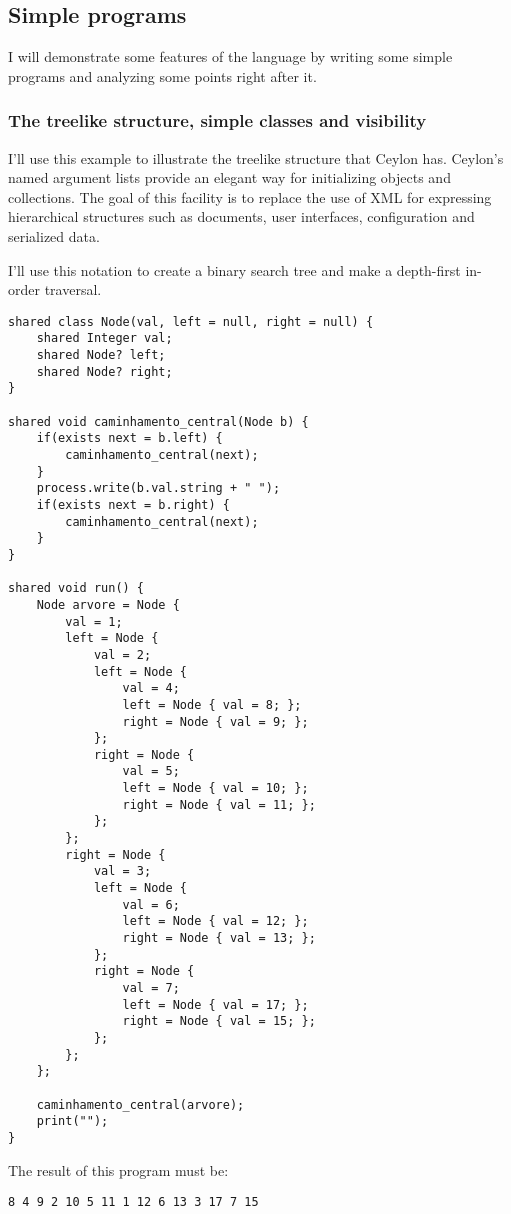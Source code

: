 \documentclass{abnt}
\begin{document}
\subsection{Simple programs}

I will demonstrate some features of the language by writing some simple programs
and analyzing some points right after it.

\subsubsection{The treelike structure, simple classes and visibility}

I'll use this example to illustrate the treelike structure that Ceylon has.
Ceylon's named argument lists provide an elegant way for initializing objects
and collections. The goal of this facility is to replace the use of XML for
expressing hierarchical structures such as documents, user interfaces,
configuration and serialized data.

I'll use this notation to create a binary search tree and make a depth-first
in-order traversal.

\begin{lstlisting}[label=ctls,caption=Ceylon treelike structure]
shared class Node(val, left = null, right = null) {
	shared Integer val;
	shared Node? left;
	shared Node? right;
}

shared void caminhamento_central(Node b) {
	if(exists next = b.left) {
		caminhamento_central(next);
	}
	process.write(b.val.string + " ");
	if(exists next = b.right) {
		caminhamento_central(next);
	}
}

shared void run() {
	Node arvore = Node {
		val = 1;
		left = Node {
			val = 2;
			left = Node {
				val = 4;
				left = Node { val = 8; };
				right = Node { val = 9; };
			};
			right = Node {
				val = 5;
				left = Node { val = 10; };
				right = Node { val = 11; };
			};
		};
		right = Node {
			val = 3;
			left = Node {
				val = 6;
				left = Node { val = 12; };
				right = Node { val = 13; };
			};
			right = Node {
				val = 7;
				left = Node { val = 17; };
				right = Node { val = 15; };
			};
		};
	};

	caminhamento_central(arvore);
	print("");
}
\end{lstlisting}

The result of this program must be:

\begin{verbatim}
8 4 9 2 10 5 11 1 12 6 13 3 17 7 15
\end{verbatim}
\end{document}
